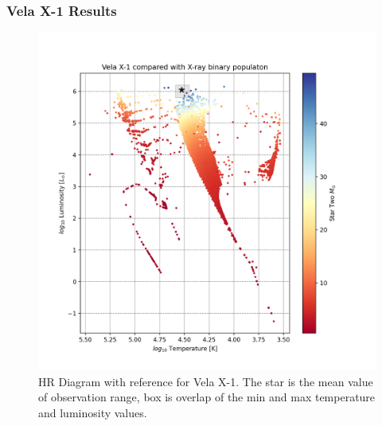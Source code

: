 \documentclass[12pt, a4paper]{article}
\begin{document}
            \subsubsection{Vela X-1 Results} \label{VelaX1Results}
            \begin{figure}[H] 
                \centering
                \includegraphics[scale = .5]{figs/GeneratedFigs/VelaX-1/VelaX1XrBPopulationHRComp.png}
                \caption{HR Diagram with reference for Vela X-1. The star is the mean value of observation range, box is overlap of the min and max temperature and luminosity values.}
                \label{VelaX1XrBPopulationHRComp}
            \end{figure}
\end{document}
